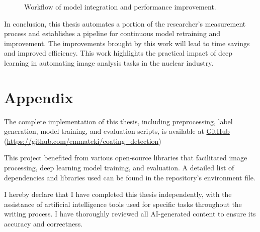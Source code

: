 \begin{figure}[H]
    \centering
    \caption{Workflow of model integration and performance improvement.}
    \label{fig:workflow-diagram}
\end{figure}

In conclusion, this thesis automates a portion of the researcher’s measurement process and establishes a pipeline for continuous model retraining and improvement. The improvements brought by this work will lead to time savings and improved efficiency. This work highlights the practical impact of deep learning in automating image analysis tasks in the nuclear industry.

\chapter{Appendix}

The complete implementation of this thesis, including preprocessing, label generation, model training, and evaluation scripts, is available at \href{https://github.com/emmateki/coating_detection}{GitHub} (\url{https://github.com/emmateki/coating_detection})


This project benefited from various open-source libraries that facilitated image processing, deep learning model training, and evaluation. A detailed list of dependencies and libraries used can be found in the repository’s environment file.

I hereby declare that I have completed this thesis independently, with the assistance of artificial intelligence tools used for specific tasks throughout the writing process. I have thoroughly reviewed all AI-generated content to ensure its accuracy and correctness.

